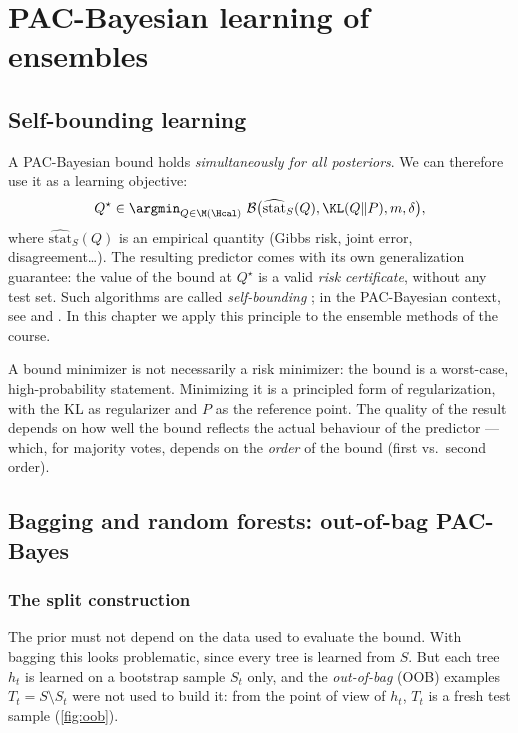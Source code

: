 \chapter{PAC-Bayesian learning of ensembles}
\label{chap:algos}

\section{Self-bounding learning}

A PAC-Bayesian bound holds \emph{simultaneously for all posteriors}. We can
therefore use it as a learning objective:
\[
Q^\star\in\argmin_{Q\in\M(\Hcal)}\ \mathcal B\big(\widehat{\text{stat}}_S(Q),\KL(Q\|P),m,\delta\big),
\]
where $\widehat{\text{stat}}_S(Q)$ is an empirical quantity (Gibbs risk, joint
error, disagreement\dots). The resulting predictor comes with its own
generalization guarantee: the value of the bound at $Q^\star$ is a valid
\emph{risk certificate}, without any test set. Such algorithms are called
\emph{self-bounding} \citep{freund1998self}; in the PAC-Bayesian context, see
\citet{germain2015risk} and \citet{viallard2021self}. In this chapter we apply this principle to the
ensemble methods of the course.

\begin{remark}
A bound minimizer is not necessarily a risk minimizer: the bound is a
worst-case, high-probability statement. Minimizing it is a principled form of
regularization, with the KL as regularizer and $P$ as the reference point.
The quality of the result depends on how well the bound reflects the actual
behaviour of the predictor --- which, for majority votes, depends on the
\emph{order} of the bound (first vs.\ second order).
\end{remark}

\section{Bagging and random forests: out-of-bag PAC-Bayes}\label{sec:oob}

\subsection{The split construction}

The prior must not depend on the data used to evaluate the bound. With
bagging this looks problematic, since every tree is learned from $S$. But
each tree $h_t$ is learned on a bootstrap sample $S_t$ only, and the
\emph{out-of-bag} (OOB) examples $T_t=S\setminus S_t$ were not used to build it:
from the point of view of $h_t$, $T_t$ is a fresh test sample
(\cref{fig:oob}).

